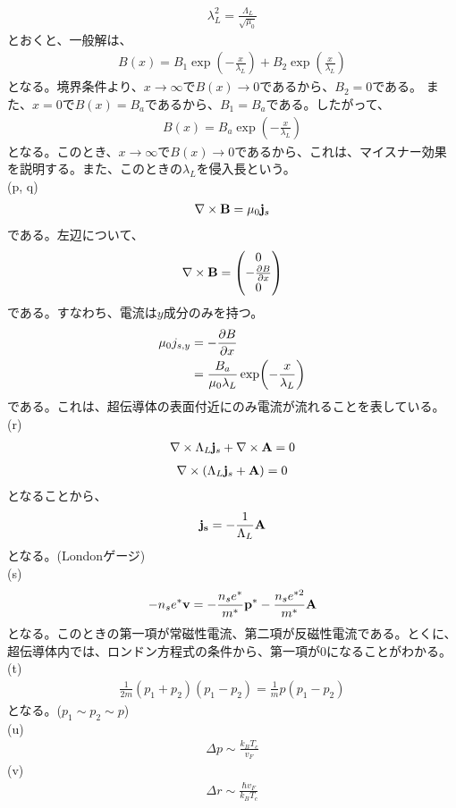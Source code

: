 \documentclass[a4paper,11pt]{jsarticle}
\numberwithin{equation}{section}
\begin{document}
\begin{align}
  \lambda^2_L = \frac{\Lambda_{L}}{\sqrt{\mu_0}}
\end{align}
とおくと、一般解は、
\begin{align}
  B(x) = B_1\exp(-\frac{x}{\lambda_L}) + B_2\exp(\frac{x}{\lambda_L})
\end{align}
となる。境界条件より、$x\to \infty$で$B(x) \to 0$であるから、$B_2 = 0$である。
また、$x =0$で$B(x) = B_a$であるから、$B_1 = B_a$である。したがって、
\begin{align}
  B(x) = B_a\exp(-\frac{x}{\lambda_L})
\end{align}
となる。このとき、$x \to \infty$で$B(x) \to 0$であるから、これは、マイスナー効果を説明する。また、このときの$\lambda_L$を侵入長という。\\
(p, q)\\
\begin{align}
  \nabla \times \vb{B} = \mu_0\vb{j}_s  
\end{align}
である。左辺について、
\begin{align}
  \nabla \times \vb{B} = 
  \begin{pmatrix}
    0\\
    -\pdv{B}{x}\\
    0
  \end{pmatrix}
\end{align}
である。すなわち、電流は$y$成分のみを持つ。
\begin{align}
  \mu_0j_{s,y} &= -\pdv{B}{x}\\
  &= \frac{B_a}{\mu_0\lambda_L}\exp(-\frac{x}{\lambda_L})
\end{align}
である。これは、超伝導体の表面付近にのみ電流が流れることを表している。\\
(r)
\begin{align}
  \nabla \times \Lambda_L\vb{j}_s + \nabla \times \vb{A} = 0
\end{align}
\begin{align}
  \nabla \times (\Lambda_L\vb{j}_s + \vb{A}) = 0
\end{align}
となることから、
\begin{align}
  \vb{j_s} = -\frac{1}{\Lambda_L}\vb{A}
\end{align}
となる。(Londonゲージ)\\
(s)
\begin{align}
  -n_se^{*}\vb{v} = -\frac{n_se^{*}}{m^*}\vb{p}^* -\frac{n_se^{*2}}{m^*}\vb{A}
\end{align}
となる。このときの第一項が常磁性電流、第二項が反磁性電流である。とくに、超伝導体内では、ロンドン方程式の条件から、第一項が0になることがわかる。\\
(t)
\begin{align}
  \frac{1}{2m}(p_1 + p_2)(p_1 - p_2) = \frac{1}{m}p(p_1-p_2)
\end{align}
となる。($p_1 \sim p_2 \sim p$)\\
(u)
\begin{align}
  \Delta p \sim \frac{k_B T_{c}}{v_F}
\end{align}
(v)
\begin{align}
  \Delta r \sim \frac{\hbar v_F}{k_B T_{c}}
\end{align}
\end{document}

